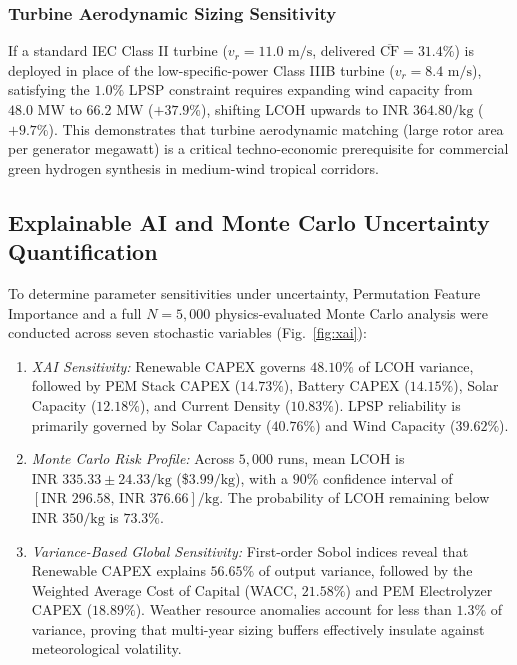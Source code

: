 \documentclass[conference]{IEEEtran}
\begin{document}
\subsubsection{Turbine Aerodynamic Sizing Sensitivity}
If a standard IEC Class II turbine ($v_r = 11.0\text{ m/s}$, delivered $\overline{\text{CF}} = 31.4\%$) is deployed in place of the low-specific-power Class IIIB turbine ($v_r = 8.4\text{ m/s}$), satisfying the $1.0\%$ LPSP constraint requires expanding wind capacity from $48.0\text{ MW}$ to $66.2\text{ MW}$ ($+37.9\%$), shifting LCOH upwards to $\text{INR } 364.80/\text{kg}$ ($+9.7\%$). This demonstrates that turbine aerodynamic matching (large rotor area per generator megawatt) is a critical techno-economic prerequisite for commercial green hydrogen synthesis in medium-wind tropical corridors.

\subsection{Explainable AI and Monte Carlo Uncertainty Quantification}
To determine parameter sensitivities under uncertainty, Permutation Feature Importance and a full $N = 5,000$ physics-evaluated Monte Carlo analysis were conducted across seven stochastic variables (Fig.~\ref{fig:xai}):
\begin{enumerate}
    \item \textit{XAI Sensitivity:} Renewable CAPEX governs $48.10\%$ of LCOH variance, followed by PEM Stack CAPEX ($14.73\%$), Battery CAPEX ($14.15\%$), Solar Capacity ($12.18\%$), and Current Density ($10.83\%$). LPSP reliability is primarily governed by Solar Capacity ($40.76\%$) and Wind Capacity ($39.62\%$).
    \item \textit{Monte Carlo Risk Profile:} Across $5,000$ runs, mean LCOH is $\text{INR } 335.33 \pm 24.33/\text{kg}$ (\$$3.99/\text{kg}$), with a $90\%$ confidence interval of $[\text{INR } 296.58,\, \text{INR } 376.66]/\text{kg}$. The probability of LCOH remaining below $\text{INR } 350/\text{kg}$ is $73.3\%$.
    \item \textit{Variance-Based Global Sensitivity:} First-order Sobol indices reveal that Renewable CAPEX explains $56.65\%$ of output variance, followed by the Weighted Average Cost of Capital (WACC, $21.58\%$) and PEM Electrolyzer CAPEX ($18.89\%$). Weather resource anomalies account for less than $1.3\%$ of variance, proving that multi-year sizing buffers effectively insulate against meteorological volatility.
\end{enumerate}
\end{document}

